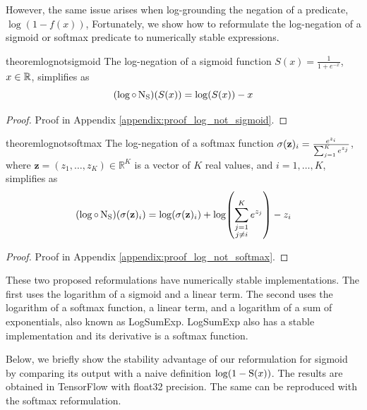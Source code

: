 \documentclass{article}
\theoremstyle{definition}
\begin{document}
However, the same issue arises when log-grounding the negation of a predicate, $\log(1-f(x))$, 
Fortunately, we show how to reformulate the log-negation of a sigmoid or softmax predicate to numerically stable expressions.

\begin{restatable}{theorem}{lognotsigmoid}
    \label{thm:log_not_sigmoid}
    The log-negation of a sigmoid function $S(x)=\frac{1}{1+e^{-x}}$, $x \in \mathbb{R}$, simplifies as 
    \begin{equation}
        \label{eq:log_not_sigmoid}
        (\log\circ\operatorname{N_{S}})(S(x)) = \log(S(x)) - x
    \end{equation}
\end{restatable}
\begin{proof}
    Proof in Appendix \ref{appendix:proof_log_not_sigmoid}.
\end{proof}

    
\begin{restatable}{theorem}{lognotsoftmax}
    \label{thm:log_not_softmax}
    The log-negation of a softmax function $\operatorname{\sigma}(\mathbf{z})_i = \frac{e^{z_i}}{\sum_{j=1}^{K} e^{z_j}}$,
    where $\mathbf{z} =(z_{1},\dotsc ,z_{K})\in \mathbb {R} ^{K}$ is a vector of $K$ real values,
    and $i=1,\dots,K$, simplifies as
    \begin{equation}
        \label{eq:log_not_softmax}
        (\log \circ \operatorname{N_{S}}) (\operatorname{\sigma}(\mathbf{z})_i) = \log(\operatorname{\sigma}(\mathbf{z})_i) + \log (\sum_{\substack{j=1\\j\neq i}}^K e^{z_j}) - z_i
    \end{equation}
\end{restatable}
\begin{proof}
    Proof in Appendix \ref{appendix:proof_log_not_softmax}.
\end{proof}

These two proposed reformulations have numerically stable implementations.
The first uses the logarithm of a sigmoid and a linear term.
The second uses the logarithm of a softmax function, a linear term, and a logarithm of a sum of exponentials, also known as LogSumExp.
LogSumExp also has a stable implementation and its derivative is a softmax function.

Below, we briefly show the stability advantage of our reformulation for sigmoid by comparing its output with a naive definition $\log(1-\operatorname{S}(x))$.
The results are obtained in TensorFlow with float32 precision.
The same can be reproduced with the softmax reformulation. 
\end{document}

